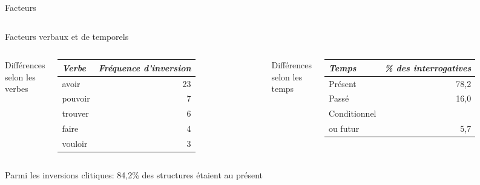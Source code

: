 \documentclass{beamer}
\begin{document}
\begin{frame}[t]{Facteurs}
\begin{columns}
      \end{columns}
    \end{frame}

    \begin{frame}[t]{Facteurs verbaux et de temporels}
      \begin{columns}
          \begin{minipage}[t][0.6\textheight]{\linewidth}
            \begin{block}{}
              Différences selon les verbes\phantom{p}
            \end{block}
            \begin{tabular}{l r}
              \emph{Verbe} & \emph{Fréquence d'inversion} \\
              \hline
              avoir        & 23 \\
              pouvoir      & 7 \\
              trouver      & 6 \\
              faire        & 4 \\
              vouloir      & 3
            \end{tabular}
          \end{minipage}
          \begin{minipage}[t][0.6\textheight]{\linewidth}
            \begin{block}{}
              Différences selon les temps
            \end{block}
            \begin{tabular}{l r}
              \emph{Temps} & \emph{\% des interrogatives} \\
              \hline
              Présent      & 78,2 \\
              Passé        & 16,0 \\
              Conditionnel & \\
              ou futur     & 5,7
            \end{tabular}
          \end{minipage}
      \end{columns}
      \begin{block}{}
        Parmi les inversions clitiques: 84,2\% des structures étaient au présent
      \end{block}
    \end{frame}
\end{document}
